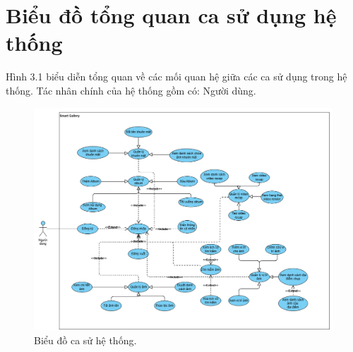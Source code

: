 \section{Biểu đồ tổng quan ca sử dụng hệ thống}
Hình 3.1 biểu diễn tổng quan về các mối quan hệ giữa các ca sử dụng trong hệ
thống. Tác nhân chính của hệ thống gồm có: Người dùng.
\begin{figure}[H]
    \centering
    \includegraphics[width=1.1\textwidth]{figures/c3/3-2-usecase-graph.png}
    \caption{Biểu đồ ca sử hệ thống.}
    \label{fig:your-label}
\end{figure}